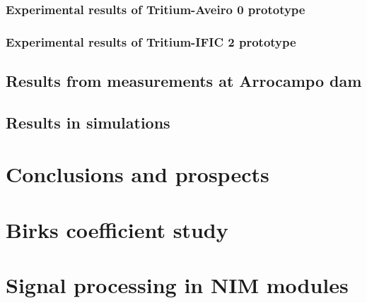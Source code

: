 \documentclass[12pt,a4paper]{book}
\begin{document}
		\subsection{Experimental results of Tritium-Aveiro 0 prototype}\label{subsec:ResultsTritiumAveiro}
		
		
		\subsection{Experimental results of Tritium-IFIC 2 prototype}\label{subsec:ResultsTritiumIFIC2}
		
		\newpage
		
	\section[Results in Arrocampo dam]{Results from measurements at Arrocampo dam}\label{sec:ResultsArrocampo}
	
	\newpage
	
	\section{Results in simulations}\label{sec:ResultsSimulations}
	
	\newpage		

\chapter{Conclusions and prospects}  \label{chap:Conclusions}

\newpage


\appendix
\appendixpage
\noappendicestocpagenum
\addappheadtotoc

\chapter{Birks coefficient study}\label{App:BirksA}


\chapter{Signal processing in NIM modules}\label{App:ElectronicModulesNIM}

\end{document}
